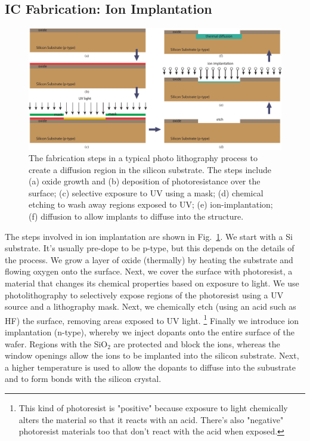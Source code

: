 \subsection{IC Fabrication: Ion Implantation}
\begin{figure}[tb]
\centering
\includegraphics[width=\columnwidth]{process_steps}
\caption{The fabrication steps in a typical photo lithography process to create a diffusion region in the silicon substrate.  The steps include (a) oxide growth and (b) deposition of photoresistance over the surface; (c) selective exposure to UV using a mask; (d) chemical etching to wash away regions exposed to UV; (e) ion-implantation; (f) diffusion to allow implants to diffuse into the structure.} \label{fig:mod2-2_ICtech_sld_4}
\end{figure}
The steps involved in ion implantation are shown in Fig.~\ref{fig:mod2-2_ICtech_sld_4}.  We start with a Si substrate.  It's usually pre-dope to be p-type, but this depends on the details of the process.  We grow a layer of oxide (thermally) by heating the substrate and flowing oxygen onto the surface.  Next, we cover the surface with photoresist, a material that changes its chemical properties based on exposure to light.  We use photolithography to selectively expose regions of the photoresist using a UV source and a lithography mask.  Next, we chemically etch (using an acid such as HF)  the surface, removing areas exposed to UV light.  \footnote{This kind of photoresist is "positive" because exposure to light chemically alters the material so that it reacts with an acid. There's also  "negative" photoresist materials too that don't react with the acid when exposed.}    Finally we introduce ion implantation (n-type), whereby we inject dopants onto the entire surface of the wafer.  Regions with the SiO$_2$ are protected and block the ions, whereas the window openings allow the ions to be implanted into the silicon substrate.  Next, a higher temperature is used to allow the dopants to diffuse into the subustrate and to form bonds with the silicon crystal. 
